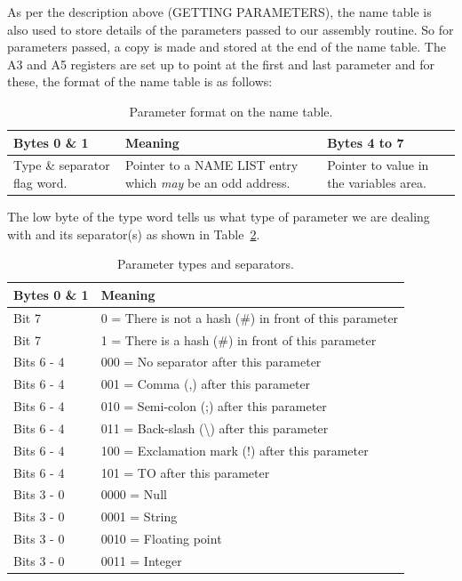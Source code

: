 As per the description above (GETTING PARAMETERS), the name table is
    also used to store details of the parameters passed to our assembly
    routine. So for parameters passed, a copy is made and stored at the end of
    the name table. The A3 and A5 registers are set up to point at the first
    and last parameter and for these, the format of the name table is as
    follows:
\begin{table}[htbp]
\centering
\begin{tabular}{p{}p{}p{}}\toprule
\textbf{Bytes 0 \& 1} & \textbf{Meaning} & \textbf{Bytes 4 to 7} \\
\midrule
%
Type \& separator flag word. &
Pointer to a NAME LIST entry which \emph{may} be an odd address. &
Pointer to value in the variables area. \\
%
\bottomrule
\end{tabular}
\caption{Parameter format on the name table.}
\label{tab:NameTableParameterFormat}
\end{table}

The low byte of the type word tells us what type of parameter we are
    dealing with and its separator(s) as shown in Table~\ref{tab:ParameterTypesAndSeparators}.

\begin{table}[htbp]
\centering
\begin{tabular}{l l}  %
\toprule
\textbf{Bytes 0 \& 1} & \textbf{Meaning} \\
\midrule
%
Bit 7 & 0 = There is not a hash (\#) in front of this parameter\\
Bit 7 & 1 = There is a hash (\#) in front of this parameter\\
Bits 6 -{} 4 & 000 = No separator after this parameter\\
Bits 6 -{} 4 & 001 = Comma (,) after this parameter\\
Bits 6 -{} 4 & 010 = Semi-{}colon (;) after this parameter\\
Bits 6 -{} 4 & 011 = Back-{}slash (\textbackslash{}) after this parameter\\
Bits 6 -{} 4 & 100 = Exclamation mark (!) after this parameter\\
Bits 6 -{} 4 & 101 = TO after this parameter\\
Bits 3 -{} 0 & 0000 = Null\\
Bits 3 -{} 0 & 0001 = String\\
Bits 3 -{} 0 & 0010 = Floating point\\
Bits 3 -{} 0 & 0011 = Integer\\
%
\bottomrule
\end{tabular}
\caption{Parameter types and separators.}
\label{tab:ParameterTypesAndSeparators}
\end{table}

